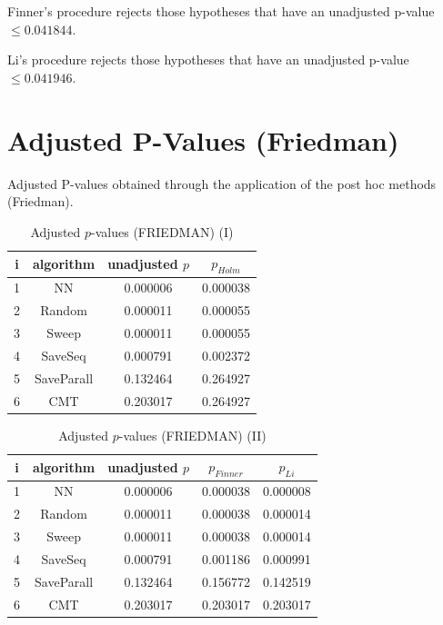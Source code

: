 \documentclass[a4paper,10pt]{article}
\begin{document}
\begin{landscape}
Finner's procedure rejects those hypotheses that have an unadjusted p-value $\le0.041844$.

Li's procedure rejects those hypotheses that have an unadjusted p-value $\le0.041946$.


\newpage

\section{Adjusted P-Values (Friedman)}


Adjusted P-values obtained through the application of the post hoc methods (Friedman).

\begin{table}[!htp]
\centering\small
\begin{tabular}{cccc}
i&algorithm&unadjusted $p$&$p_{Holm}$\\
\hline1&NN&0.000006&0.000038\\2&Random&0.000011&0.000055\\3&Sweep&0.000011&0.000055\\4&SaveSeq&0.000791&0.002372\\5&SaveParall&0.132464&0.264927\\6&CMT&0.203017&0.264927\\\hline
\end{tabular}
\caption{Adjusted $p$-values (FRIEDMAN) (I)}
\end{table}
\begin{table}[!htp]
\centering\small
\begin{tabular}{ccccc}
i&algorithm&unadjusted $p$&$p_{Finner}$&$p_{Li}$\\
\hline1&NN&0.000006&0.000038&0.000008\\2&Random&0.000011&0.000038&0.000014\\3&Sweep&0.000011&0.000038&0.000014\\4&SaveSeq&0.000791&0.001186&0.000991\\5&SaveParall&0.132464&0.156772&0.142519\\6&CMT&0.203017&0.203017&0.203017\\\hline
\end{tabular}
\caption{Adjusted $p$-values (FRIEDMAN) (II)}
\end{table}

\newpage
\end{landscape}
\end{document}
